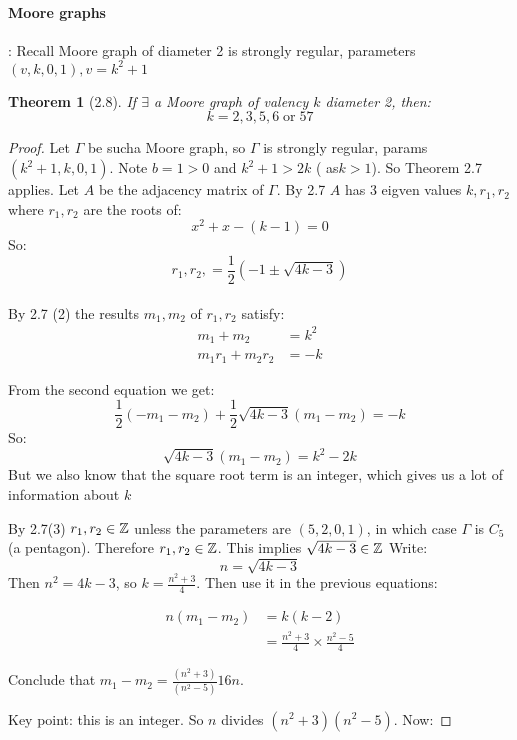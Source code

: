 \documentclass[]{article}
\newtheorem{thm}{Theorem}[section]
\theoremstyle{definition}
\theoremstyle{remark}
\numberwithin{equation}{section}
\begin{document}
			\paragraph{Moore graphs}: Recall Moore graph of diameter 2 is strongly regular, parameters $(v, k, 0, 1), v=k^2 +1$
				\begin{thm}[2.8]
					If $\exists$ a Moore graph of valency $k$ diameter 2, then:
					\[
						k = 2,3,5,6\; \text{or}\; 57
					\]
				\end{thm}
				\begin{proof}
					Let $\Gamma$ be sucha Moore graph, so $\Gamma$ is strongly regular, params $(k^2 +1, k, 0, 1)$. Note $b = 1 > 0$ and $k^2 + 1 > 2k$  ( as$k > 1$). So Theorem 2.7 applies. Let $A$ be the adjacency matrix of $\Gamma$. By 2.7 $A$ has 3 eigven values $k, r_1, r_2$ where $r_1, r_2$ are the roots of:
					\[x^2 + x - (k-1) = 0\]
					So:\[r_1, r_2, = \frac{1}{2}\left( -1 \pm \sqrt{4k-3}\right)\]
					\\
					By 2.7 (2) the results $m_1, m_2$ of $r_1, r_2$ satisfy:
					\begin{align*}
						m_1 + m_2 &= k^2\\
						m_1 r_1 + m_2 r_2 &= -k
					\end{align*}

					From the second equation we get:
					\[
						\frac{1}{2}\left(-m_1 -m_2\right) + \frac{1}{2}\sqrt{4k-3}\left( m_1 - m_2\right) = -k
					\]
					So:
					\[
						\sqrt{4k - 3}\left(m_1 - m_2\right) = k^2 - 2k
					\]
					But we also know that the square root term is an integer, which gives us a lot of information about $k$

					By 2.7(3) $r_1, r_2 \in \mathbb{Z}$ unless the parameters are $(5, 2, 0, 1)$, in which case $\Gamma$ is $C_5$ (a pentagon). Therefore $r_1, r_2 \in \mathbb{Z}$. This implies $\sqrt{4k-3} \in \mathbb{Z}$ Write:
					\[
						n = \sqrt{4k-3}
					\]
					Then $n^2 = 4k - 3$, so $k = \frac{n^2 + 3}{4}$. Then use it in the previous equations:

					\begin{align*}
						n(m_1 - m_2) &= k(k-2)\\
									 &= \frac{n^2+3}{4} \times \frac{n^2-5}{4}
					\end{align*}

					Conclude that $m_1 - m_2 = \frac{(n^2+3)}{(n^2-5)}{16n}$.

					Key point: this is an integer. So $n$ divides $(n^2+3)(n^2 - 5)$.
					Now:


\end{proof}
\end{document}
